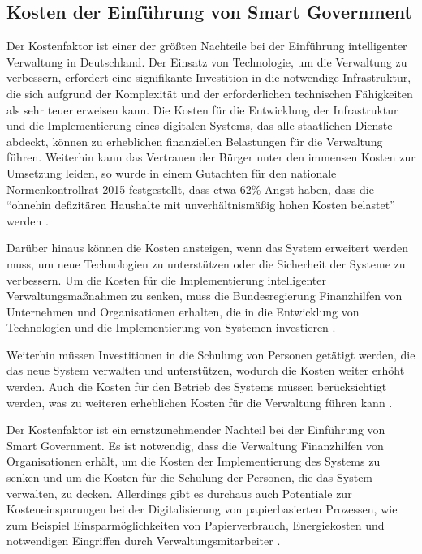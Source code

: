 \subsection{Kosten der Einführung von Smart Government}
Der Kostenfaktor ist einer der größten Nachteile bei der Einführung intelligenter Verwaltung in Deutschland.
Der Einsatz von Technologie, um die Verwaltung zu verbessern, erfordert eine signifikante Investition in die notwendige Infrastruktur, die sich aufgrund der Komplexität und der erforderlichen technischen Fähigkeiten als sehr teuer erweisen kann.
Die Kosten für die Entwicklung der Infrastruktur und die Implementierung eines digitalen Systems, das alle staatlichen Dienste abdeckt, können zu erheblichen finanziellen Belastungen für die Verwaltung führen.
Weiterhin kann das Vertrauen der Bürger unter den immensen Kosten zur Umsetzung leiden, so wurde in einem Gutachten für den nationale Normenkontrollrat 2015 festgestellt, dass etwa 62\% Angst haben, dass die ``ohnehin defizitären Haushalte mit unverhältnismäßig hohen Kosten belastet'' werden \citep[][S. 16]{NationalenNormenkontrollrat2015}.
\par
Darüber hinaus können die Kosten ansteigen, wenn das System erweitert werden muss, um neue Technologien zu unterstützen oder die Sicherheit der Systeme zu verbessern.
Um die Kosten für die Implementierung intelligenter Verwaltungsmaßnahmen zu senken, muss die Bundesregierung Finanzhilfen von Unternehmen und Organisationen erhalten, die in die Entwicklung von Technologien und die Implementierung von Systemen investieren \citep[][S. 51]{NationalenNormenkontrollrat2015}.
\par
Weiterhin müssen Investitionen in die Schulung von Personen getätigt werden, die das neue System verwalten und unterstützen, wodurch die Kosten weiter erhöht werden.
Auch die Kosten für den Betrieb des Systems müssen berücksichtigt werden, was zu weiteren erheblichen Kosten für die Verwaltung führen kann \citep[][S. 52, 88]{NationalenNormenkontrollrat2015}.
\par
Der Kostenfaktor ist ein ernstzunehmender Nachteil bei der Einführung von Smart Government.
Es ist notwendig, dass die Verwaltung Finanzhilfen von Organisationen erhält, um die Kosten der Implementierung des Systems zu senken und um die Kosten für die Schulung der Personen, die das System verwalten, zu decken.
Allerdings gibt es durchaus auch Potentiale zur Kosteneinsparungen bei der Digitalisierung von papierbasierten Prozessen, wie zum Beispiel Einsparmöglichkeiten von Papierverbrauch, Energiekosten und notwendigen Eingriffen durch Verwaltungsmitarbeiter \citep[Vgl.][S.179]{von_Lucke_2016}.